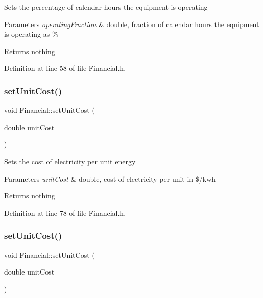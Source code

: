Sets the percentage of calendar hours the equipment is operating


\begin{DoxyParams}{Parameters}
{\em operating\+Fraction} & double, fraction of calendar hours the equipment is operating as \%\\
\hline
\end{DoxyParams}
\begin{DoxyReturn}{Returns}
nothing 
\end{DoxyReturn}


Definition at line 58 of file Financial.\+h.

\mbox{\label{class_financial_a84ead2ef72b2d348e05eb308d01e9265}} 
\subsubsection{\texorpdfstring{set\+Unit\+Cost()}{setUnitCost()}\hspace{0.1cm}{\footnotesize\ttfamily [1/3]}}
{\footnotesize\ttfamily void Financial\+::set\+Unit\+Cost (\begin{DoxyParamCaption}\item[{double}]{unit\+Cost }\end{DoxyParamCaption})\hspace{0.3cm}{\ttfamily [inline]}}

Sets the cost of electricity per unit energy


\begin{DoxyParams}{Parameters}
{\em unit\+Cost} & double, cost of electricity per unit in \$/kwh\\
\hline
\end{DoxyParams}
\begin{DoxyReturn}{Returns}
nothing 
\end{DoxyReturn}


Definition at line 78 of file Financial.\+h.

\mbox{\label{class_financial_a84ead2ef72b2d348e05eb308d01e9265}} 
\subsubsection{\texorpdfstring{set\+Unit\+Cost()}{setUnitCost()}\hspace{0.1cm}{\footnotesize\ttfamily [2/3]}}
{\footnotesize\ttfamily void Financial\+::set\+Unit\+Cost (\begin{DoxyParamCaption}\item[{double}]{unit\+Cost }\end{DoxyParamCaption})\hspace{0.3cm}{\ttfamily [inline]}}

